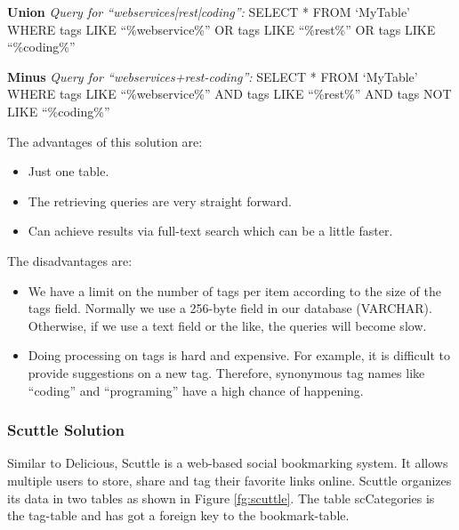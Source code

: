 \textbf{Union}\newline
\textit{Query for ``webservices|rest|coding'':}\newline\newline
SELECT *\newline
FROM `MyTable'\newline
WHERE tags LIKE ``\%webservice\%''\newline
OR tags LIKE ``\%rest\%''\newline
OR tags LIKE ``\%coding\%''

\textbf{Minus}\newline
\textit{Query for ``webservices+rest-coding'':}\newline\newline
SELECT *\newline
FROM `MyTable'\newline
WHERE tags LIKE ``\%webservice\%''\newline
AND tags LIKE ``\%rest\%''\newline
AND tags NOT LIKE ``\%coding\%''

The advantages of this solution are:
\begin{itemize}
   \item Just one table.
   \item The retrieving queries are very straight forward.
   \item Can achieve results via full-text search which can be a little faster.
\end{itemize}

The disadvantages are:
\begin{itemize}
   \item We have a limit on the number of tags per item according to the size of the tags field. Normally we use a 256-byte field in our database (VARCHAR). Otherwise, if we use a text field or the like, the queries will become slow.
   \item Doing processing on tags is hard and expensive. For example, it is difficult to provide suggestions on a new tag. Therefore, synonymous tag names like ``coding'' and ``programing'' have a high chance of happening.
\end{itemize}

\subsubsection{Scuttle Solution}
Similar to Delicious, Scuttle \cite{scuttle} is a web-based social bookmarking system. It allows multiple users to store, share and tag their favorite links online. Scuttle organizes its data in two tables as shown in Figure \ref{fg:scuttle}. The table scCategories is the tag-table and has got a foreign key to the bookmark-table.

